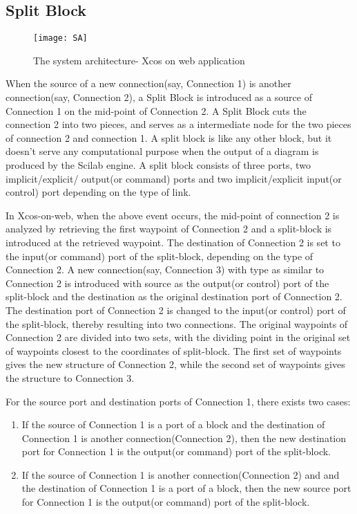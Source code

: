 \documentclass[conference]{IEEEtran}
\begin{document}
\subsection{Split Block}
\begin{figure}
    \centering
    \texttt{[image: SA]}
    \caption{The system architecture- Xcos on web application}
    \label{fig:my_label}
\end{figure}
When the source of a new connection(say, Connection 1) is another connection(say, Connection 2), a Split Block is introduced as a source of Connection 1 on the mid-point of Connection 2. A Split Block cuts the connection 2 into two pieces, and serves as a intermediate node for the two pieces of connection 2 and connection 1. A split block is like any other block, but it doesn't serve any computational purpose when the output of a diagram is produced by the Scilab engine. A split block consists of three ports, two implicit/explicit/ output(or command) ports and two implicit/explicit input(or control) port depending on the type of link.

In Xcos-on-web, when the above event occurs, the mid-point of connection 2 is analyzed by retrieving the first waypoint of Connection 2 and a split-block is introduced at the retrieved waypoint. The destination of Connection 2 is set to the input(or command) port of the split-block, depending on the type of Connection 2. A new connection(say, Connection 3) with type as similar to Connection 2 is introduced with source as the output(or control) port of the split-block and the destination as the original destination port of Connection 2. The destination port of Connection 2 is changed to the input(or control) port of the split-block, thereby resulting into two connections. The original waypoints of Connection 2 are divided into two sets, with the dividing point in the original set of waypoints closest to the coordinates of split-block. The first set of waypoints gives the new structure of Connection 2, while the second set of waypoints gives the structure to Connection 3.

For the source port and destination ports of Connection 1, there exists two cases:

\begin{enumerate}
  \item If the source of Connection 1 is a port of a block and the destination of Connection 1 is another connection(Connection 2), then the new destination port for Connection 1 is the output(or command) port of the split-block.
  
  \item If the source of Connection 1 is another connection(Connection 2) and  and the destination of Connection 1 is a port of a block, then the new source port for Connection 1 is the output(or command) port of the split-block.
  
\end{enumerate}
\end{document}
